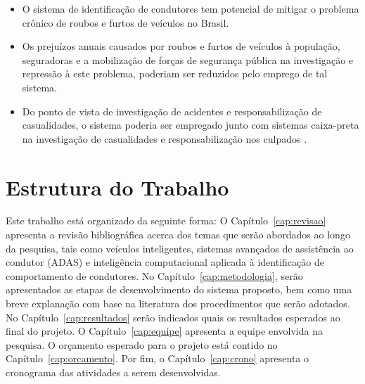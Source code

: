 \begin{itemize}

	\item O sistema de identificação de condutores tem potencial de mitigar o problema crônico de roubos e furtos de veículos no Brasil.
	
	\item Os prejuízos anuais causados por roubos e furtos de veículos à população, seguradoras e a mobilização de forças de segurança pública na investigação e repressão à este problema, poderiam ser reduzidos pelo emprego de tal sistema.
	
	\item Do ponto de vista de investigação de acidentes e responsabilização de casualidades, o sistema poderia ser empregado junto com sistemas caixa-preta na investigação de casualidades e responsabilização nos culpados \cite{Barbosa2017}.


\end{itemize}


\section{Estrutura do Trabalho}

Este trabalho está organizado da seguinte forma: O Capítulo~\ref{cap:revisao} apresenta a revisão bibliográfica acerca dos temas que serão abordados ao longo da pesquisa, tais como veículos inteligentes, sistemas avançados de assistência ao condutor (ADAS) e inteligência computacional aplicada à identificação de comportamento de condutores. No Capítulo~\ref{cap:metodologia}, serão apresentados as etapas de desenvolvimento do sistema proposto, bem como uma breve explanação com base na literatura dos procedimentos que serão adotados. No Capítulo~\ref{cap:resultados} serão indicados quais os resultados esperados ao final do projeto. O Capítulo~\ref{cap:equipe} apresenta a equipe envolvida na pesquisa. O orçamento esperado para o projeto está contido no Capítulo~\ref{cap:orcamento}. Por fim, o Capítulo~\ref{cap:crono} apresenta o cronograma das atividades a serem desenvolvidas.